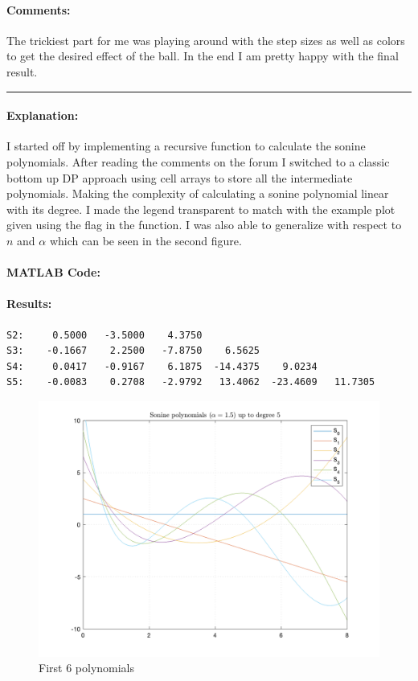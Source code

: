\paragraph{Comments:}
The trickiest part for me was playing around with the step sizes as well as colors to get the desired effect of the ball.
In the end I am pretty happy with the final result.

\bigskip
\hrule


\paragraph{Explanation:}
I started off by implementing a recursive function to calculate the sonine polynomials.
After reading the comments on the forum I switched to a classic bottom up DP approach using cell arrays to store all the intermediate polynomials.
Making the complexity of calculating a sonine polynomial linear with its degree.
I made the legend transparent to match with the example plot given using the  flag in the  function.
I was also able to generalize with respect to $n$ and $\alpha$ which can be seen in the second figure.

\paragraph{MATLAB Code:}
\begin{tiny}
    
\end{tiny}

\paragraph{Results:}
\begin{verbatim}
S2:     0.5000   -3.5000    4.3750
S3:    -0.1667    2.2500   -7.8750    6.5625
S4:     0.0417   -0.9167    6.1875  -14.4375    9.0234
S5:    -0.0083    0.2708   -2.9792   13.4062  -23.4609   11.7305
\end{verbatim}

\begin{figure}[H]
    \centering
    \includegraphics[width=12cm]{figures/ex3}
    \caption{First 6 polynomials}
\end{figure}

